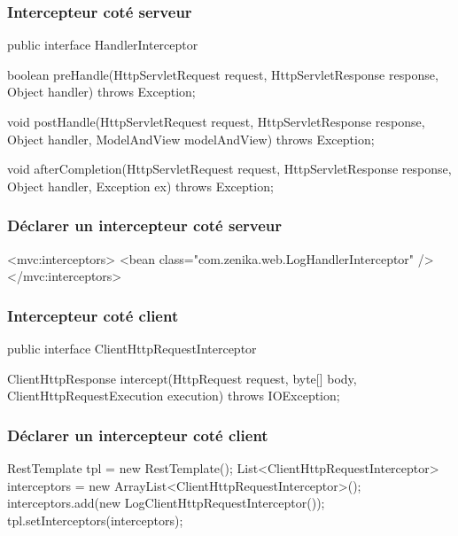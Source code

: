 \begin{frame}[fragile]
 \frametitle{Intercepteur coté serveur} 
 
 \begin{javacode}
public interface HandlerInterceptor {
  
  boolean preHandle(HttpServletRequest request, 
                    HttpServletResponse response, 
                    Object handler) throws Exception;

  void postHandle(HttpServletRequest request, 
                  HttpServletResponse response, 
                  Object handler, ModelAndView modelAndView)
             throws Exception;
  
  void afterCompletion(HttpServletRequest request, 
                       HttpServletResponse response, 
                       Object handler, Exception ex)
             throws Exception;

}
 \end{javacode}

\end{frame} 

\begin{frame}[fragile]
 \frametitle{Déclarer un intercepteur coté serveur} 
 
 \begin{xmlcode}
<mvc:interceptors>
  <bean class="com.zenika.web.LogHandlerInterceptor" />
</mvc:interceptors>
 \end{xmlcode}

\end{frame} 

\begin{frame}[fragile]
 \frametitle{Intercepteur coté client} 
 
 \begin{javacode}
public interface ClientHttpRequestInterceptor {

  ClientHttpResponse intercept(HttpRequest request, byte[] body, 
                               ClientHttpRequestExecution execution)
                       throws IOException;

}
 \end{javacode}

\end{frame} 

\begin{frame}[fragile]
 \frametitle{Déclarer un intercepteur coté client} 
 
 \begin{javacode}
RestTemplate tpl = new RestTemplate();
List<ClientHttpRequestInterceptor> interceptors = 
  new ArrayList<ClientHttpRequestInterceptor>();
interceptors.add(new LogClientHttpRequestInterceptor());
tpl.setInterceptors(interceptors);
 \end{javacode}

\end{frame} 